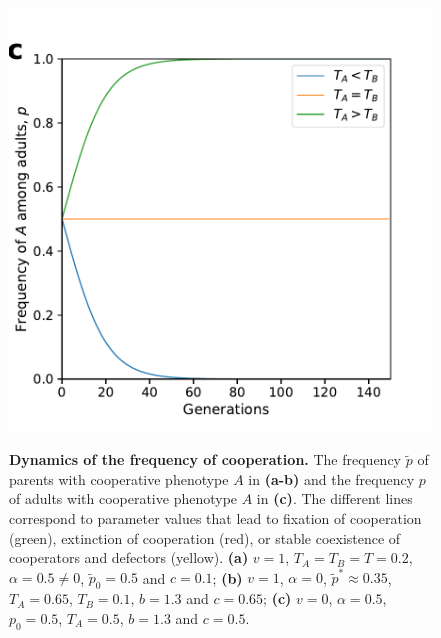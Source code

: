 \documentclass[12pt]{extarticle}
\begin{document}
\begin{figure}[p]
    ~\\
    \includegraphics[scale=0.45]{Time_Figure_No_Vertical.pdf}
  \caption{
  \textbf{Dynamics of the frequency of cooperation.}
  The frequency $\tilde{p}$ of parents with cooperative phenotype $A$ in \textbf{(a-b)} and the frequency $p$ of adults with cooperative phenotype $A$ in \textbf{(c)}.
  The different lines correspond to parameter values that lead to fixation of cooperation (green), extinction of cooperation (red), or stable coexistence of cooperators and defectors (yellow).
  \textbf{(a)} $v=1$, $T_A=T_B=T = 0.2$, $\alpha = 0.5 \neq 0$, $\tilde{p}_0 = 0.5$ and $c=0.1$; \textbf{(b)} $v=1$, $\alpha = 0$, $\tilde{p}^* \approx 0.35$, $T_A = 0.65$, $T_B = 0.1$, $b=1.3$ and $c=0.65$; \textbf{(c)} $v=0$, $\alpha =0.5$, $p_0 = 0.5$, $T_A = 0.5$, $b=1.3$ and $c = 0.5$.
  }
  \label{fig:results}
\end{figure}



\end{document}
